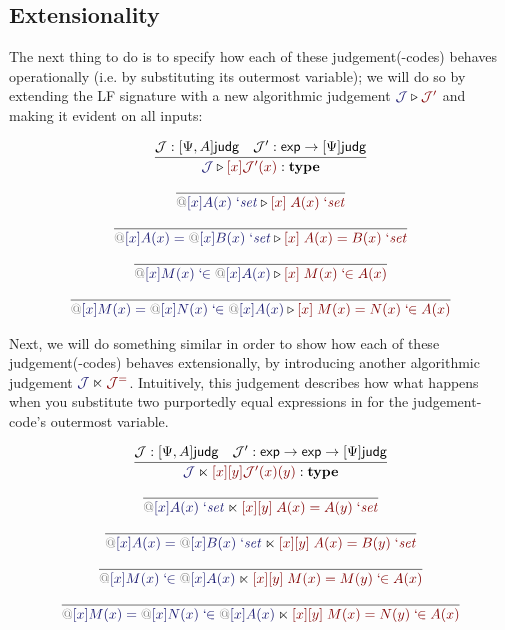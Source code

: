 \documentclass[acmtoplas]{acmtrans2m}
\makeatletter
\def\InputModeColorName{MidnightBlue}
\def\OutputModeColorName{Maroon}
\newcommand\InputMode[1]{{\color{\InputModeColorName}{#1}}}
\newcommand\OutputMode[1]{{\color{\OutputModeColorName}{#1}}}
\newcommand\type{\mathbf{type}}
\newcommand\sortexp{\mathsf{exp}}
\newcommand\sortj{\mathsf{judg}}
\newcommand\sortoj[1]{[#1]\sortj}
\newcommand\bind[2]{{\color{Gray}@}[#1]#2}
\newcommand\qisset[1]{#1\;`\mathit{set}}
\newcommand\qeqset[2]{#1=#2\;`\mathit{set}}
\newcommand\qmem[2]{#1\;`\!\!\in#2}
\newcommand\qeqmem[3]{#1=#2\;`\!\!\in#3}
\newcommand\sploot[2]{\InputMode{#1}\triangleright\OutputMode{#2}}
\newcommand\refract[2]{\InputMode{#1}\ltimes\OutputMode{#2}}
\newcommand\dname[1]{\mathcal{#1}}
\makeatother
\begin{document}
\subsection{Extensionality}

The next thing to do is to specify how each of these judgement(-codes) behaves
operationally (i.e. by substituting its outermost variable); we will do so by
extending the LF signature with a new algorithmic judgement
$\sploot{\dname{J}}{\dname{J}'}$ and making it evident on all inputs:

\begin{gather*}
  \infer{
    \sploot{\dname{J}}{[x]\dname{J}'(x)}:\type
  }{
    \dname{J}:\sortoj{\Psi,A} &
    \dname{J}': \sortexp\to\sortoj\Psi
  }\\[6pt]
  \infer{
    \sploot{
      \qisset{\bind{x}{A(x)}}
    }{
      [x]\; \qisset{A(x)}
    }
  }{
  }\\[6pt]
  \infer{
    \sploot{
      \qeqset{\bind{x}{A(x)}}{\bind{x}{B(x)}}
    }{
      [x]\; \qeqset{A(x)}{B(x)}
    }
  }{
  }\\[6pt]
  \infer{
    \sploot{
      \qmem{\bind{x}{M(x)}}{\bind{x}{A(x)}}
    }{
      [x]\; \qmem{M(x)}{A(x)}
    }
  }{
  }\\[6pt]
  \infer{
    \sploot{
      \qeqmem{\bind{x}{M(x)}}{\bind{x}{N(x)}}{\bind{x}{A(x)}}
    }{
      [x]\; \qeqmem{M(x)}{N(x)}{A(x)}
    }
  }{
  }
\end{gather*}

Next, we will do something similar in order to show how each of these
judgement(-codes) behaves extensionally, by introducing another algorithmic
judgement $\refract{\dname{J}}{\dname{J}^=}$. Intuitively, this judgement
describes how what happens when you substitute two purportedly equal
expressions in for the judgement-code's outermost variable.

\begin{gather*}
  \infer{
    \refract{\dname{J}}{[x][y]\dname{J}'(x)(y)}:\type
  }{
    \dname{J}:\sortoj{\Psi,A} &
    \dname{J}': \sortexp\to\sortexp\to\sortoj\Psi
  }\\[6pt]
  \infer{
    \refract{
      \qisset{\bind{x}{A(x)}}
    }{
      [x][y]\; \qeqset{A(x)}{A(y)}
    }
  }{
  }\\[6pt]
  \infer{
    \refract{
      \qeqset{\bind{x}{A(x)}}{\bind{x}{B(x)}}
    }{
      [x][y]\; \qeqset{A(x)}{B(y)}
    }
  }{
  }\\[6pt]
  \infer{
    \refract{
      \qmem{\bind{x}{M(x)}}{\bind{x}{A(x)}}
    }{
      [x][y]\; \qeqmem{M(x)}{M(y)}{A(x)}
    }
  }{
  }\\[6pt]
  \infer{
    \refract{
      \qeqmem{\bind{x}{M(x)}}{\bind{x}{N(x)}}{\bind{x}{A(x)}}
    }{
      [x][y]\; \qeqmem{M(x)}{N(y)}{A(x)}
    }
  }{
  }
\end{gather*}
\end{document}
